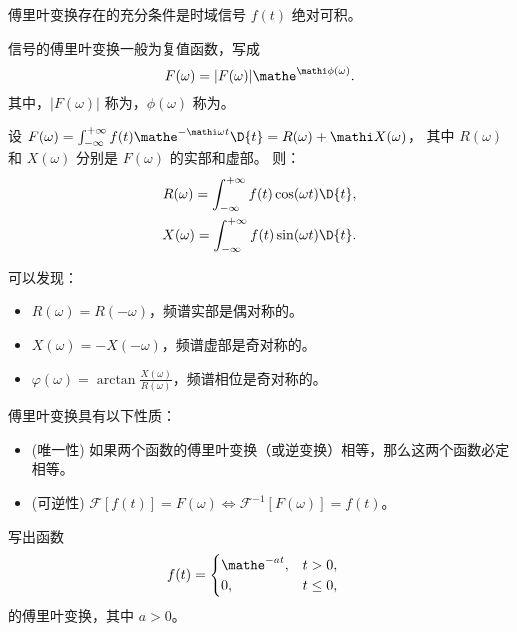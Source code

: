 \begin{theorem}
    傅里叶变换存在的充分条件是时域信号 $f(t)$ 绝对可积。
\end{theorem}

\begin{definition}[傅里叶频谱]
    信号的傅里叶变换一般为复值函数，写成
    \begin{equation}
        F(\omega) = |F(\omega)|\mathe^{\mathi\phi(\omega)}.
    \end{equation}
    其中，$|F(\omega)|$ 称为，$\phi(\omega)$ 称为。
\end{definition}

\begin{example}
    设 $F(\omega) = \int_{-\infty}^{+\infty}f(t)\mathe^{-\mathi \omega t}\D{t} = R(\omega) + \mathi X(\omega)$，
    其中 $R(\omega)$ 和 $X(\omega)$ 分别是 $F(\omega)$ 的实部和虚部。
    则：
    \begin{align*}
        R(\omega) = \int_{-\infty}^{+\infty} f(t)\cos(\omega t)\D{t}, \\
        X(\omega) = \int_{-\infty}^{+\infty} f(t)\sin(\omega t)\D{t}.
    \end{align*}

    可以发现：
    \begin{itemize}
        \item $R(\omega) = R(-\omega)$，频谱实部是偶对称的。
        \item $X(\omega) = -X(-\omega)$，频谱虚部是奇对称的。
        \item $\varphi(\omega) = \arctan\frac{X(\omega)}{R(\omega)}$，频谱相位是奇对称的。
    \end{itemize}
\end{example}

\begin{property}[傅里叶变换的性质]
    傅里叶变换具有以下性质：
    \begin{itemize}
        \item (唯一性) 如果两个函数的傅里叶变换（或逆变换）相等，那么这两个函数必定相等。
        \item (可逆性) $\mathcal{F}[f(t)] = F(\omega) \iff \mathcal{F}^{-1}[F(\omega)] = f(t)$。
    \end{itemize}
\end{property}

\begin{homework}
    写出函数
    \begin{align*}
        f(t) &= \begin{cases}
            \mathe^{-at}, & t > 0, \\
            0, & t \leq 0,
        \end{cases}
    \end{align*}
    的傅里叶变换，其中 $a > 0$。
\end{homework}

